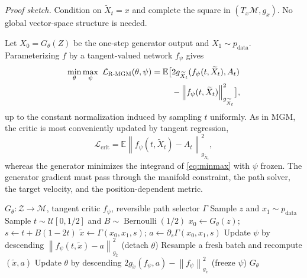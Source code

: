 \documentclass[10pt,twocolumn]{article}
\newcommand{\M}{\mathcal{M}}
\newcommand{\E}{\mathbb{E}}
\newcommand{\Ber}{\operatorname{Bernoulli}}
\newcommand{\norm}[2][]{\left\lVert #2\right\rVert_{#1}}
\newcommand{\RMGM}{\textsc{R-MGM}}
\begin{document}
\noindent\textit{Proof sketch.}
Condition on $\widetilde X_t=x$ and complete the square in $(T_x\M,g_x)$. No global vector-space structure is needed.

Let $X_0=G_\theta(Z)$ be the one-step generator output and $X_1\sim p_{\mathrm{data}}$. Parameterizing $f$ by a tangent-valued network $f_\psi$ gives
\begin{align}
 \min_\theta\max_\psi\ \mathcal L_{\RMGM}(\theta,\psi)
 =\E\bigl[&2g_{\widetilde X_t}(f_\psi(t,\widetilde X_t),A_t)\notag\\[-2pt]
 &-\norm[g_{\widetilde X_t}]{f_\psi(t,\widetilde X_t)}^2\bigr],
 \label{eq:minmax}
\end{align}
up to the constant normalization induced by sampling $t$ uniformly. As in MGM, the critic is most conveniently updated by tangent regression,
\begin{equation}
 \mathcal L_{\mathrm{crit}}
 =\E\norm[g_{\widetilde X_t}]{f_\psi(t,\widetilde X_t)-A_t}^2,
 \label{eq:critic-loss}
\end{equation}
whereas the generator minimizes the integrand of \cref{eq:minmax} with $\psi$ frozen. The generator gradient must pass through the manifold constraint, the path solver, the target velocity, and the position-dependent metric.

\begin{algorithm}[t]
\caption{Intrinsic Riemannian MGM}
\label{alg:rmgm}
\begin{algorithmic}[1]
\Require $G_\theta: \mathcal Z\to\M$, tangent critic $f_\psi$, reversible path selector $\Gamma$
\Repeat
  \State Sample $z$ and $x_1\sim p_{\mathrm{data}}$
  \State Sample $t\sim\mathcal U[0,1/2]$ and $B\sim\Ber(1/2)$
  \State $x_0\gets G_\theta(z)$; $s\gets t+B(1-2t)$
  \State $\widetilde x\gets\Gamma(x_0,x_1,s)$; $a\gets\partial_s\Gamma(x_0,x_1,s)$
  \State Update $\psi$ by descending $\norm[g_{\widetilde x}]{f_\psi(t,\widetilde x)-a}^2$ (detach $\theta$)
  \State Resample a fresh batch and recompute $(\widetilde x,a)$
  \State Update $\theta$ by descending $2g_{\widetilde x}(f_\psi,a)-\norm[g_{\widetilde x}]{f_\psi}^2$ (freeze $\psi$)
\State \Return $G_\theta$
\end{algorithmic}
\end{algorithm}
\end{document}
